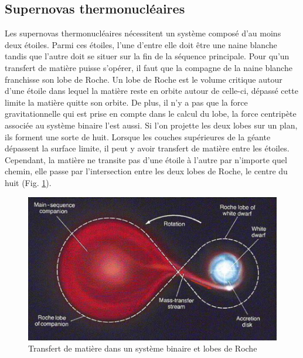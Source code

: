 \vfill
{}

\subsection{Supernovas thermonucléaires}\label{3.1.2} 

Les supernovas thermonucléaires nécessitent un système composé d'au moins deux étoiles. Parmi ces étoiles, l'une d'entre elle doit être une naine blanche tandis que l'autre doit se situer sur la fin de la séquence principale. Pour qu'un transfert de matière puisse s'opérer, il faut que la compagne de la naine blanche franchisse son lobe de Roche. Un lobe de Roche est le volume critique autour d'une étoile dans lequel la matière reste en orbite autour de celle-ci, dépassé cette limite la matière quitte son orbite. De plus, il n'y a pas que la force gravitationnelle qui est prise en compte dans le calcul du lobe, la force centripète associée au système binaire l'est aussi. Si l'on projette les deux lobes sur un plan, ils forment une sorte de huit. Lorsque les couches supérieures de la géante dépassent la surface limite, il peut y avoir transfert de matière entre les étoiles. Cependant, la matière ne transite pas d'une étoile à l'autre par n'importe quel chemin, elle passe par l'intersection entre les deux lobes de Roche, le centre du huit (Fig. \ref{Fig. 3.2}).\bigskip

\begin{figure}[H]
	\centering
	\includegraphics[scale=0.6]{images/lobederoche}
	\caption[Transfert de matière dans un système binaire et lobes de Roche\newline \url{http://chandra.harvard.edu/edu/formal/snr/bg3.html}]{Transfert de matière dans un système binaire et lobes de Roche}
	\label{Fig. 3.2}
\end{figure}\bigskip 

